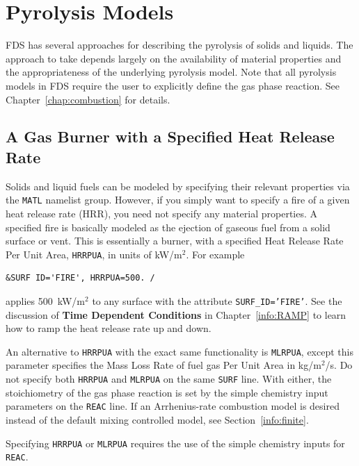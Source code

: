 \documentclass[11pt]{book}
\newcommand{\ct}{\tt\small}
\begin{document}
\clearpage

\section{Pyrolysis Models}

FDS has several approaches for describing the pyrolysis of solids and liquids. The approach to take depends largely
on the availability of material properties and the appropriateness of the underlying pyrolysis model.
Note that all pyrolysis models in FDS require the user to explicitly define the gas phase reaction. See Chapter~\ref{chap:combustion} for details.

\subsection{A Gas Burner with a Specified Heat Release Rate}

\label{info:gas_burner}

Solids and liquid fuels can be modeled by specifying their relevant
properties via the {\ct MATL} namelist group. However, if you simply
want to specify a fire of a given heat release rate (HRR),
you need not specify any material properties. A specified fire is
basically modeled as the ejection of gaseous fuel
from a solid surface or vent. This is essentially a burner, with a
specified Heat Release Rate Per Unit Area, {\ct HRRPUA}, in units of
kW/m$^2$. For example

\footnotesize
\begin{verbatim}
&SURF ID='FIRE', HRRPUA=500. /
\end{verbatim}
\normalsize

\noindent
applies 500~kW/m$^2$ to any surface with the attribute
{\ct SURF\_ID='FIRE'}. See the discussion of {\bf Time Dependent Conditions}
in Chapter~\ref{info:RAMP} to learn how to ramp the heat release rate up and down.

An alternative to {\ct HRRPUA} with the exact same functionality is
{\ct MLRPUA}, except this parameter
specifies the Mass Loss Rate of fuel gas Per Unit Area in kg/m$^2$/s. Do not specify both
{\ct HRRPUA} and {\ct MLRPUA} on the same {\ct SURF} line. With either,
the stoichiometry of the gas phase reaction is set by the simple chemistry input
parameters on the {\ct REAC} line.
If an Arrhenius-rate combustion model is desired instead of the default mixing controlled model, see Section~\ref{info:finite}.

\begin{warning}
Specifying {\ct HRRPUA} or {\ct MLRPUA} requires the use of the simple chemistry inputs for {\ct REAC}.
\end{warning}
\end{document}

